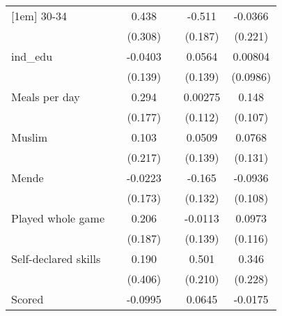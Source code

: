 {\begin{tabular}{l*{5}{c}}
[1em]
30-34               &                     &       0.438         &                     &      -0.511\sym{***}&     -0.0366         \\
                    &                     &     (0.308)         &                     &     (0.187)         &     (0.221)         \\
[1em]
ind\_edu             &                     &     -0.0403         &                     &      0.0564         &     0.00804         \\
                    &                     &     (0.139)         &                     &     (0.139)         &    (0.0986)         \\
[1em]
Meals per day       &                     &       0.294\sym{*}  &                     &     0.00275         &       0.148         \\
                    &                     &     (0.177)         &                     &     (0.112)         &     (0.107)         \\
[1em]
Muslim              &                     &       0.103         &                     &      0.0509         &      0.0768         \\
                    &                     &     (0.217)         &                     &     (0.139)         &     (0.131)         \\
[1em]
Mende               &                     &     -0.0223         &                     &      -0.165         &     -0.0936         \\
                    &                     &     (0.173)         &                     &     (0.132)         &     (0.108)         \\
[1em]
Played whole game   &                     &       0.206         &                     &     -0.0113         &      0.0973         \\
                    &                     &     (0.187)         &                     &     (0.139)         &     (0.116)         \\
[1em]
Self-declared skills&                     &       0.190         &                     &       0.501\sym{**} &       0.346         \\
                    &                     &     (0.406)         &                     &     (0.210)         &     (0.228)         \\
[1em]
Scored              &                     &     -0.0995         &                     &      0.0645         &     -0.0175         \\

\end{tabular}}

